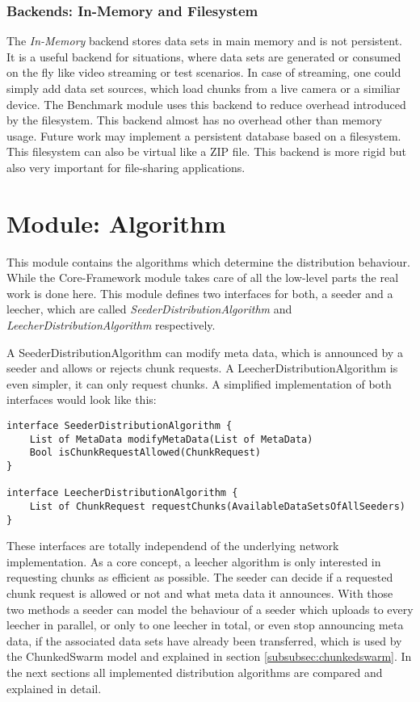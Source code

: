 \subsubsection{Backends: In-Memory and Filesystem}
The \emph{In-Memory} backend stores data sets in main memory and is not persistent. It is a useful backend for situations, where data sets are generated or consumed on the fly like video streaming or test scenarios. In case of streaming, one could simply add data set sources, which load chunks from a live camera or a similiar device. The Benchmark module uses this backend to reduce overhead introduced by the filesystem. This backend almost has no overhead other than memory usage. Future work may implement a persistent database based on a filesystem. This filesystem can also be virtual like a ZIP file. This backend is more rigid but also very important for file-sharing applications.


\cleardoublepage
\section{Module: Algorithm}
\label{sec:algorithm}
This module contains the algorithms which determine the distribution behaviour. While the Core-Framework module takes care of all the low-level parts the real work is done here. This module defines two interfaces for both, a seeder and a leecher, which are called \emph{SeederDistributionAlgorithm} and \emph{LeecherDistributionAlgorithm} respectively. 

A SeederDistributionAlgorithm can modify meta data, which is announced by a seeder and allows or rejects chunk requests. A LeecherDistributionAlgorithm is even simpler, it can only request chunks. A simplified implementation of both interfaces would look like this:

\begin{verbatim}
interface SeederDistributionAlgorithm {
    List of MetaData modifyMetaData(List of MetaData)
    Bool isChunkRequestAllowed(ChunkRequest)
}

interface LeecherDistributionAlgorithm {
    List of ChunkRequest requestChunks(AvailableDataSetsOfAllSeeders)
}
\end{verbatim}

These interfaces are totally independend of the underlying network implementation. As a core concept, a leecher algorithm is only interested in requesting chunks as efficient as possible. The seeder can decide if a requested chunk request is allowed or not and what meta data it announces. With those two methods a seeder can model the behaviour of a seeder which uploads to every leecher in parallel, or only to one leecher in total, or even stop announcing meta data, if the associated data sets have already been transferred, which is used by the ChunkedSwarm model and explained in section \ref{subsubsec:chunkedswarm}. In the next sections all implemented distribution algorithms are compared and explained in detail.

